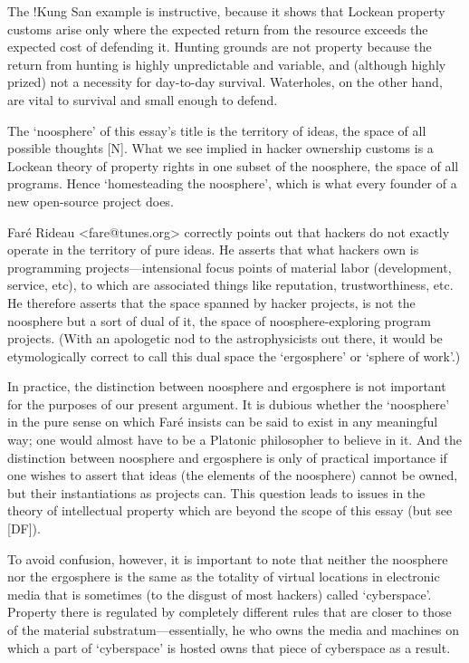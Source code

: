 The !Kung San example is instructive, because it shows that Lockean property
customs arise only where the expected return from the resource exceeds the
expected cost of defending it.  Hunting grounds are not property because the
return from hunting is highly unpredictable and variable, and (although highly
prized) not a necessity for day-to-day survival.  Waterholes, on the other hand,
are vital to survival and small enough to defend.

The `noosphere' of this essay's title is the territory of ideas, the space of
all possible thoughts [N].  What we see implied in hacker ownership customs is a
Lockean theory of property rights in one subset of the noosphere, the space of
all programs.  Hence `homesteading the noosphere', which is what every founder
of a new open-source project does.

Faré Rideau <fare@tunes.org> correctly points out that hackers do not exactly
operate in the territory of pure ideas.  He asserts that what hackers own is
programming projects—intensional focus points of material labor (development,
service, etc), to which are associated things like reputation, trustworthiness,
etc.  He therefore asserts that the space spanned by hacker projects, is not the
noosphere but a sort of dual of it, the space of noosphere-exploring program
projects.  (With an apologetic nod to the astrophysicists out there, it would be
etymologically correct to call this dual space the `ergosphere' or `sphere of
work'.)

In practice, the distinction between noosphere and ergosphere is not important
for the purposes of our present argument.  It is dubious whether the `noosphere'
in the pure sense on which Faré insists can be said to exist in any meaningful
way; one would almost have to be a Platonic philosopher to believe in it.  And
the distinction between noosphere and ergosphere is only of practical importance
if one wishes to assert that ideas (the elements of the noosphere) cannot be
owned, but their instantiations as projects can.  This question leads to issues
in the theory of intellectual property which are beyond the scope of this essay
(but see [DF]).

To avoid confusion, however, it is important to note that neither the noosphere
nor the ergosphere is the same as the totality of virtual locations in
electronic media that is sometimes (to the disgust of most hackers) called
`cyberspace'.  Property there is regulated by completely different rules that
are closer to those of the material substratum—essentially, he who owns the
media and machines on which a part of `cyberspace' is hosted owns that piece of
cyberspace as a result.

